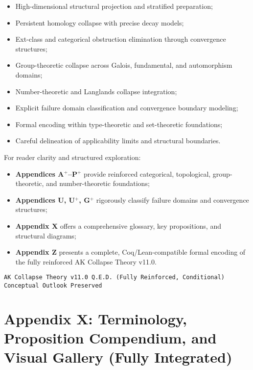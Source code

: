 \documentclass[11pt]{article}
\begin{document}
\begin{itemize}
    \item High-dimensional structural projection and stratified preparation;
    \item Persistent homology collapse with precise decay models;
    \item Ext-class and categorical obstruction elimination through convergence structures;
    \item Group-theoretic collapse across Galois, fundamental, and automorphism domains;
    \item Number-theoretic and Langlands collapse integration;
    \item Explicit failure domain classification and convergence boundary modeling;
    \item Formal encoding within type-theoretic and set-theoretic foundations;
    \item Careful delineation of applicability limits and structural boundaries.
\end{itemize}

For reader clarity and structured exploration:

\begin{itemize}
    \item \textbf{Appendices A$^{+}$–P$^{+}$} provide reinforced categorical, topological, group-theoretic, and number-theoretic foundations;
    \item \textbf{Appendices U, U$^{+}$, G$^{+}$} rigorously classify failure domains and convergence structures;
    \item \textbf{Appendix X} offers a comprehensive glossary, key propositions, and structural diagrams;
    \item \textbf{Appendix Z} presents a complete, Coq/Lean-compatible formal encoding of the fully reinforced AK Collapse Theory v11.0.
\end{itemize}

\begin{center}
\texttt{AK Collapse Theory v11.0 \quad Q.E.D. (Fully Reinforced, Conditional) \quad Conceptual Outlook Preserved}
\end{center}




\section*{Appendix X: Terminology, Proposition Compendium, and Visual Gallery (Fully Integrated)}
\end{document}
